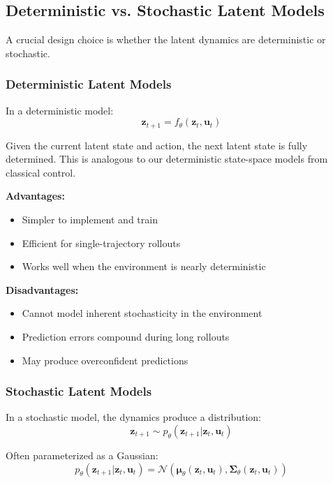 \subsection{Deterministic vs. Stochastic Latent Models}

A crucial design choice is whether the latent dynamics are deterministic or stochastic.

\subsubsection{Deterministic Latent Models}

In a deterministic model:
\begin{equation}
\mathbf{z}_{t+1} = f_\theta(\mathbf{z}_t, \mathbf{u}_t)
\end{equation}

Given the current latent state and action, the next latent state is fully determined. This is analogous to our deterministic state-space models from classical control.

\textbf{Advantages:}
\begin{itemize}
    \item Simpler to implement and train
    \item Efficient for single-trajectory rollouts
    \item Works well when the environment is nearly deterministic
\end{itemize}

\textbf{Disadvantages:}
\begin{itemize}
    \item Cannot model inherent stochasticity in the environment
    \item Prediction errors compound during long rollouts
    \item May produce overconfident predictions
\end{itemize}

\subsubsection{Stochastic Latent Models}

In a stochastic model, the dynamics produce a distribution:
\begin{equation}
\mathbf{z}_{t+1} \sim p_\theta(\mathbf{z}_{t+1} | \mathbf{z}_t, \mathbf{u}_t)
\end{equation}

Often parameterized as a Gaussian:
\begin{equation}
p_\theta(\mathbf{z}_{t+1} | \mathbf{z}_t, \mathbf{u}_t) = \mathcal{N}(\boldsymbol{\mu}_\theta(\mathbf{z}_t, \mathbf{u}_t), \boldsymbol{\Sigma}_\theta(\mathbf{z}_t, \mathbf{u}_t))
\end{equation}

